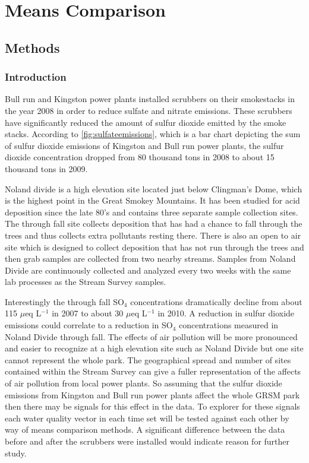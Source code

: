 \chapter{Means Comparison}\label{ch:mc}
\section{Methods}
\subsection{Introduction}

Bull run and Kingston power plants installed scrubbers on their smokestacks in the year 2008 in order to reduce sulfate and nitrate emissions.
These scrubbers have significantly reduced the amount of sulfur dioxide emitted by the smoke stacks.
According to \autoref{fig:sulfateemissions}, which is a bar chart depicting the sum of sulfur dioxide emissions of Kingston and Bull run power plants,  the sulfur dioxide concentration dropped from 80 thousand tons in 2008 to about 15 thousand tons in 2009.

Noland divide is a high elevation site located just below Clingman's Dome, which is the highest point in the Great Smokey Mountains.  
It has been studied for acid deposition since the late 80's and contains three separate sample collection sites.
The through fall site collects deposition that has had a chance to fall through the trees and thus collects extra pollutants resting there.
There is also an open to air site which is designed to collect deposition that has not run through the trees and then grab samples are collected from two nearby streams.
Samples from Noland Divide are continuously collected and analyzed every two weeks with the same lab processes as the Stream Survey samples.

Interestingly the through fall SO$_4$ concentrations dramatically decline from about 115 $\mu$eq L$^{-1}$ in 2007 to about 30 $\mu$eq L$^{-1}$ in 2010.
A reduction in sulfur dioxide emissions could correlate to a reduction in SO$_4$ concentrations measured in Noland Divide through fall.
The effects of air pollution will be more pronounced and easier to recognize at a high elevation site such as Noland Divide but one site cannot represent the whole park.
The geographical spread and number of sites contained within the Stream Survey can give a fuller representation of the affects of air pollution from local power plants.
So assuming that the sulfur dioxide emissions from Kingston and Bull run power plants affect the whole GRSM park then there may be signals for this effect in the data.
To explorer for these signals each water quality vector in each time set will be tested against each other by way of means comparison methods.
A significant difference between the data before and after the scrubbers were installed would indicate reason for further study.

